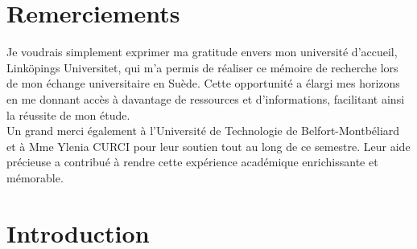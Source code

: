 \documentclass[12pt, a4paper]{report}
\begin{document}
\tahomafont

\makeutbmfrontcover{}

\topmargin -1.5cm
\pagestyle{fancy}
\fancyhf{}
\fancyfoot[C]{\thepage}

\renewcommand{\headrulewidth}{1pt}

\chapter*{Remerciements}

Je voudrais simplement exprimer ma gratitude envers mon université d'accueil, Linköpings Universitet, qui m'a permis de réaliser ce mémoire de recherche lors de mon échange universitaire en Suède. Cette opportunité a élargi mes horizons en me donnant accès à davantage de ressources et d'informations, facilitant ainsi la réussite de mon étude.\\

Un grand merci également à l'Université de Technologie de Belfort-Montbéliard et à Mme Ylenia CURCI pour leur soutien tout au long de ce semestre. Leur aide précieuse a contribué à rendre cette expérience académique enrichissante et mémorable.

\tableofcontents

\chapter{Introduction}



\end{document}
